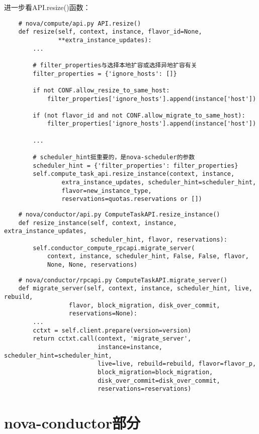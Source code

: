 \documentclass[a4paper,left=1.5cm,right=1.5cm,11pt]{article}
\begin{document}
	进一步看API.resize()函数：
	\begin{lstlisting}
	# nova/compute/api.py API.resize()
	def resize(self, context, instance, flavor_id=None,
               **extra_instance_updates):
		...

		# filter_properties与选择本地扩容或选择异地扩容有关
        filter_properties = {'ignore_hosts': []}

        if not CONF.allow_resize_to_same_host:
            filter_properties['ignore_hosts'].append(instance['host'])

        if (not flavor_id and not CONF.allow_migrate_to_same_host):
            filter_properties['ignore_hosts'].append(instance['host'])
		
		...

		# scheduler_hint挺重要的，是nova-scheduler的参数
        scheduler_hint = {'filter_properties': filter_properties}
        self.compute_task_api.resize_instance(context, instance,
                extra_instance_updates, scheduler_hint=scheduler_hint,
                flavor=new_instance_type,
                reservations=quotas.reservations or [])
	\end{lstlisting}

	\begin{lstlisting}
	# nova/conductor/api.py ComputeTaskAPI.resize_instance()
	def resize_instance(self, context, instance, extra_instance_updates,
                        scheduler_hint, flavor, reservations):
        self.conductor_compute_rpcapi.migrate_server(
            context, instance, scheduler_hint, False, False, flavor,
            None, None, reservations)
	\end{lstlisting}

	\begin{lstlisting}
	# nova/conductor/rpcapi.py ComputeTaskAPI.migrate_server()
	def migrate_server(self, context, instance, scheduler_hint, live, rebuild,
                  flavor, block_migration, disk_over_commit,
                  reservations=None):
		...
		cctxt = self.client.prepare(version=version)
        return cctxt.call(context, 'migrate_server',
                          instance=instance, scheduler_hint=scheduler_hint,
                          live=live, rebuild=rebuild, flavor=flavor_p,
                          block_migration=block_migration,
                          disk_over_commit=disk_over_commit,
                          reservations=reservations)
	\end{lstlisting}

\section{nova-conductor部分}
\end{document}
